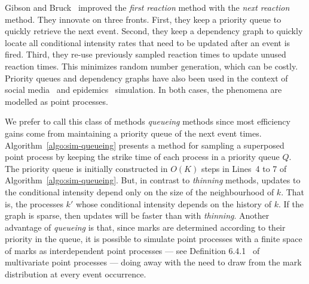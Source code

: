 \documentclass{juliacon}
\begin{document}
Gibson and Bruck~\cite{gibson2000} improved the \textit{first reaction} method with the \textit{next reaction} method. They innovate on three fronts. First, they keep a priority queue to quickly retrieve the next event. Second, they keep a dependency graph to quickly locate all conditional intensity rates that need to be updated after an event is fired. Third, they re-use previously sampled reaction times to update unused reaction times. This minimizes random number generation, which can be costly. Priority queues and dependency graphs have also been used in the context of social media~\cite{farajtabar2017} and epidemics~\cite{holme2021} simulation. In both cases, the phenomena are modelled as point processes.

We prefer to call this class of methods \textit{queueing} methods since most efficiency gains come from maintaining a priority queue of the next event times. Algorithm~\ref{algo:sim-queueing} presents a method for sampling a superposed point process by keeping the strike time of each process in a priority queue \( Q \). The priority queue is initially constructed in \( O(K) \) steps in Lines~4 to 7 of Algorithm~\ref{algo:sim-queueing}. But, in contrast to \textit{thinning} methods, updates to the conditional intensity depend only on the size of the neighbourhood of \( k \). That is, the processes \( k' \) whose conditional intensity depends on the history of \( k \). If the graph is sparse, then updates will be faster than with \textit{thinning}. Another advantage of \textit{queueing} is that, since marks are determined according to their priority in the queue, it is possible to simulate point processes with a finite space of marks as interdependent point processes --- see Definition 6.4.1~\cite{daley2003} of multivariate point processes --- doing away with the need to draw from the mark distribution at every event occurrence.
\end{document}
